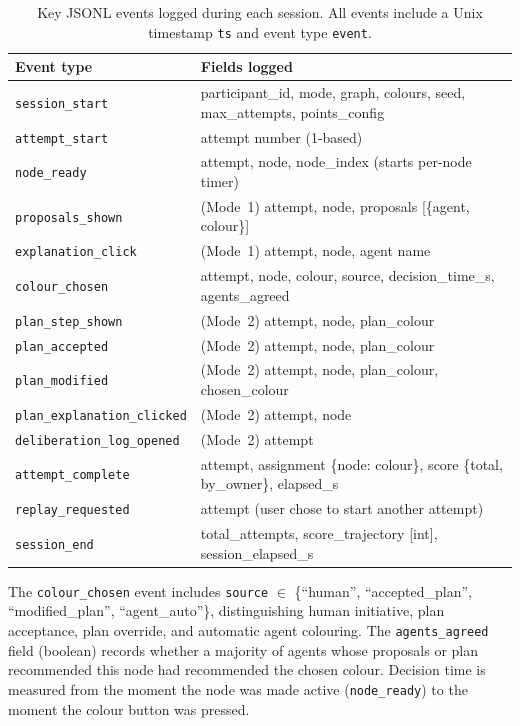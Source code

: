 \documentclass[11pt]{article}
\theoremstyle{definition}
\begin{document}
\begin{table}[h]
\centering
\caption{Key JSONL events logged during each session.
         All events include a Unix timestamp \texttt{ts} and event type \texttt{event}.}
\label{tab:events}
\begin{tabularx}{\linewidth}{lX}
\toprule
\textbf{Event type}          & \textbf{Fields logged} \\
\midrule
\texttt{session\_start}      & participant\_id, mode, graph, colours, seed, max\_attempts, points\_config \\
\texttt{attempt\_start}      & attempt number (1-based) \\
\texttt{node\_ready}         & attempt, node, node\_index (starts per-node timer) \\
\texttt{proposals\_shown}    & (Mode~1) attempt, node, proposals [\{agent, colour\}] \\
\texttt{explanation\_click}  & (Mode~1) attempt, node, agent name \\
\texttt{colour\_chosen}      & attempt, node, colour, source, decision\_time\_s, agents\_agreed \\
\texttt{plan\_step\_shown}   & (Mode~2) attempt, node, plan\_colour \\
\texttt{plan\_accepted}      & (Mode~2) attempt, node, plan\_colour \\
\texttt{plan\_modified}      & (Mode~2) attempt, node, plan\_colour, chosen\_colour \\
\texttt{plan\_explanation\_clicked} & (Mode~2) attempt, node \\
\texttt{deliberation\_log\_opened}  & (Mode~2) attempt \\
\texttt{attempt\_complete}   & attempt, assignment \{node: colour\}, score \{total, by\_owner\}, elapsed\_s \\
\texttt{replay\_requested}   & attempt (user chose to start another attempt) \\
\texttt{session\_end}        & total\_attempts, score\_trajectory [int], session\_elapsed\_s \\
\bottomrule
\end{tabularx}
\end{table}

The \texttt{colour\_chosen} event includes \texttt{source} $\in$ \{``human'',
``accepted\_plan'', ``modified\_plan'', ``agent\_auto''\}, distinguishing human
initiative, plan acceptance, plan override, and automatic agent colouring.  The
\texttt{agents\_agreed} field (boolean) records whether a majority of agents whose
proposals or plan recommended this node had recommended the chosen colour.
Decision time is measured from the moment the node was made active
(\texttt{node\_ready}) to the moment the colour button was pressed.
\end{document}
